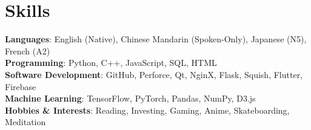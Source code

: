 \section{Skills}
 \begin{itemize}[leftmargin=0.5cm, label={}]
    \small{\item{
     \textbf{Languages}{: English (Native), Chinese Mandarin (Spoken-Only), Japanese (N5), French (A2)} \\
     \textbf{Programming}{: Python, C++, JavaScript, SQL, HTML} \\
     \textbf{Software Development}{: GitHub, Perforce, Qt, NginX, Flask, Squish, Flutter, Firebase} \\
     \textbf{Machine Learning}{: TensorFlow, PyTorch, Pandas, NumPy, D3.js} \\
     \textbf{Hobbies \& Interests}{: Reading, Investing, Gaming, Anime, Skateboarding, Meditation} \\
    }}
 \end{itemize}